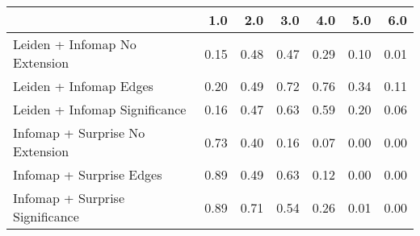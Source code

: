 \begin{tabular}{lrrrrrr}
\toprule
{} &  1.0 &  2.0 &  3.0 &  4.0 &  5.0 &  6.0 \\
\midrule
Leiden + Infomap No Extension   & 0.15 & 0.48 & 0.47 & 0.29 & 0.10 & 0.01 \\
Leiden + Infomap Edges          & 0.20 & 0.49 & 0.72 & 0.76 & 0.34 & 0.11 \\
Leiden + Infomap Significance   & 0.16 & 0.47 & 0.63 & 0.59 & 0.20 & 0.06 \\
Infomap + Surprise No Extension & 0.73 & 0.40 & 0.16 & 0.07 & 0.00 & 0.00 \\
Infomap + Surprise Edges        & 0.89 & 0.49 & 0.63 & 0.12 & 0.00 & 0.00 \\
Infomap + Surprise Significance & 0.89 & 0.71 & 0.54 & 0.26 & 0.01 & 0.00 \\
\bottomrule
\end{tabular}
